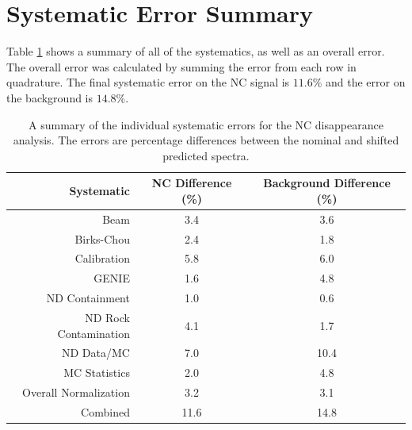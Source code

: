 \section{Systematic Error Summary}

Table \ref{tab:SystSummary} shows a summary of all of the systematics, as well as an overall error. The overall error was calculated by summing the error from each row in quadrature. The final systematic error on the NC signal is $11.6\%$ and the error on the background is $14.8\%$.
\begin{table}[h]
  \begin{center}
    \caption[Systematic Error Summary]{A summary of the individual systematic errors for the NC disappearance analysis. The errors are percentage differences between the nominal and shifted predicted spectra.}
    \label{tab:SystSummary}
    \begin{tabular}{r c c}
      \hline\hline
      Systematic & NC Difference (\%) & Background Difference (\%) \\
      \hline
      Beam & 3.4 & 3.6 \\
      Birks-Chou & 2.4 & 1.8 \\
      Calibration & 5.8 & 6.0 \\
      GENIE & 1.6 & 4.8 \\
      ND Containment & 1.0 & 0.6 \\
      ND Rock Contamination & 4.1 & 1.7 \\
      ND Data/MC & 7.0 & 10.4 \\
      MC Statistics & 2.0 & 4.8 \\
      Overall Normalization & 3.2 & 3.1 \\
      \hline
      Combined & 11.6 & 14.8 \\
      \hline
    \end{tabular}
  \end{center}
\end{table}

